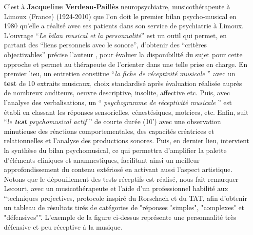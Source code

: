 C'est à \textbf{Jacqueline Verdeau-Paillès} neuropsychiatre,
  musicothérapeute à Limoux (France) (1924-2010) que l'on doit le premier bilan
                     psycho-musical en 1980 qu'elle a réalisé avec ses patients dans son service
                     de psychiatrie à Limoux.
L'ouvrage \enquote {\textit{Le bilan musical et la personnalité}}\autocite{verdeau-pailles:bilan}
                     est un outil qui permet, en partant des \enquote {liens personnels avec le sonore}, d'obtenir des \enquote {critères objectivables} précise l'auteur  \autocite[37]{vrait_musicotherapie_2018}, pour évaluer la disponibilité du sujet pour cette
                     approche et permet au thérapeute de l'orienter dans
                                 une telle prise en charge. En premier lieu, un entretien constitue \enquote {\textit{la 
                                 fiche de réceptivité musicale} } avec un \textbf{test} de 10 extraits musicaux, choix 
                                 standardisé après évaluation réalisée auprès de nombreux auditeurs, oeuvre 
                                 descriptive, insolite, affective etc.
Puis, avec l'analyse des verbalisations, un \enquote { \textit{psychogramme de réceptivité musicale} } est établi en classant les réponses sensorielles, cénestésiques, motrices, etc. Enfin, suit \enquote {\textit{le \textbf{test}  psychomusical actif} } \autocite{verdeau_expression} de courte durée (10') avec une observation minutieuse des réactions comportementales, des capacités créatrices et relationnelles et l'analyse des productions sonores. Puis, en  dernier lieu, intervient la synthèse du bilan psychomusical, ce qui permettra d'amplifier la palette d'éléments
                                cliniques et anamnestiques, facilitant ainsi un meilleur approfondissement du
                                 contenu extériosé en activant aussi l'aspect artistique.
Notons que le dépouillement des tests réceptifs est réalisé, nous fait remarquer Lecourt, avec un 
musicothérapeute et l'aide d'un professionnel habilité aux \enquote {techniques projectives, protocole 
inspiré du Rorschach et du TAT, afin d'obtenir un tableau de résultats tirés de catégories de "réponses 
"simples", "complexes" et "défensives"}\autocite[p.86] {lecourt_les_2017}. L'exemple  de la figure 
ci-dessus %
représente  
une personnalité très défensive et peu réceptive à la musique. 
